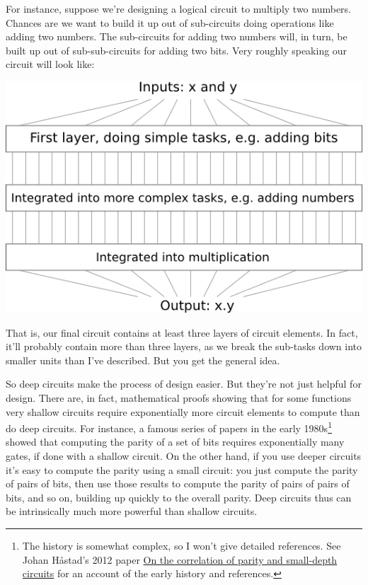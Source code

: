 \documentclass[a4paper,twoside,10pt]{book}
\begin{document}
For instance, suppose we're designing a logical circuit to multiply two numbers. Chances are we want to build it up out of sub-circuits doing operations like adding two numbers. The sub-circuits for adding two numbers will, in turn, be built up out of sub-sub-circuits for adding two bits. Very roughly speaking our circuit will look like:
\begin{center}
	\includegraphics[width=0.7\linewidth]{figures/ch5/circuit_multiplication}
\end{center}
That is, our final circuit contains at least three layers of circuit elements. In fact, it'll probably contain more than three layers, as we break the sub-tasks down into smaller units than I've described. But you get the general idea.

So deep circuits make the process of design easier. But they're not just helpful for design. There are, in fact, mathematical proofs showing that for some functions very shallow circuits require exponentially more circuit elements to compute than do deep circuits. For instance, a famous series of papers in the early 1980s\footnote{The history is somewhat complex, so I won't give detailed references. See Johan H\aa{}stad's 2012 paper \href{http://eccc.hpi-web.de/report/2012/137/}{On the correlation of parity and small-depth circuits} for an account of the early history and references.} showed that computing the parity of a set of bits requires exponentially many gates, if done with a shallow circuit. On the other hand, if you use deeper circuits it's easy to compute the parity using a small circuit: you just compute the parity of pairs of bits, then use those results to compute the parity of pairs of pairs of bits, and so on, building up quickly to the overall parity. Deep circuits thus can be intrinsically much more powerful than shallow circuits.
\end{document}
